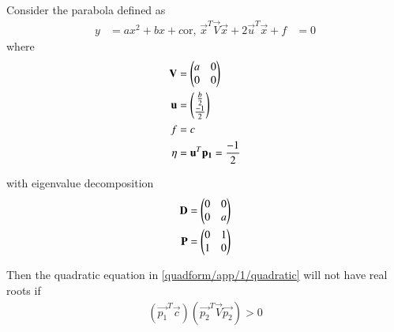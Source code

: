 \begin{lemma}
    Consider the parabola defined as
    \begin{align}
        \label{quadform/app/1/quadratic}
        y &= ax^2+bx+c 
\text{or, }
    \vec{x}^T\vec{V}\vec{x} + 2\vec{u}^T\vec{x} + f &= 0
\end{align}
%
where
\begin{align}
    \mathbf{V} &= \begin{pmatrix}a & 0 \\ 0 & 0\end{pmatrix}
    \\
    \mathbf{u} &= \begin{pmatrix}\frac{b}{2} \\ \frac{-1}{2}\end{pmatrix}
    \\
    f &= c
\\
        \eta &= \mathbf{u}^T\mathbf{p_1} = \frac{-1}{2}
    \end{align}
    

%
with  eigenvalue decomposition
\begin{align}
    \mathbf{D} &= \begin{pmatrix}0 & 0 \\ 0 & a\end{pmatrix} \\
    \mathbf{P} &= \begin{pmatrix}0 & 1 \\ 1 & 0\end{pmatrix}
\end{align}

Then the quadratic equation in         \eqref{quadform/app/1/quadratic} will not have real roots if 
\begin{align}
    \label{quadform/app/1/imag}
    \boxed{(\vec{p_1}^T\vec{c})(\vec{p_2}^T\vec{V}\vec{p_2}) > 0}
\end{align}
    
\end{lemma}
